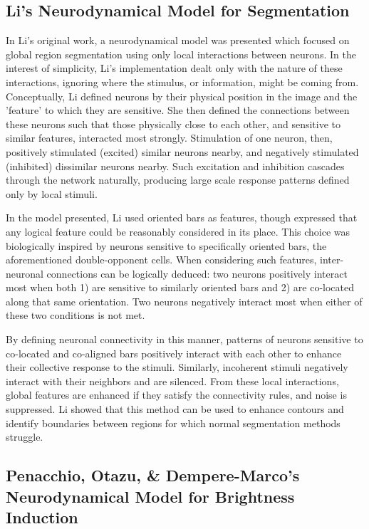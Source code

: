 \documentclass[journal,onecolumn]{IEEEtran}
\begin{document}
\subsection*{Li's Neurodynamical Model for Segmentation \cite{li:1999}}
In Li's original work, a neurodynamical model was presented which focused on global region segmentation using only local interactions between neurons. In the interest of simplicity, Li's implementation dealt only with the nature of these interactions, ignoring where the stimulus, or information, might be coming from. Conceptually, Li defined neurons by their physical position in the image and the 'feature' to which they are sensitive. She then defined the connections between these neurons such that those physically close to each other, and sensitive to similar features, interacted most strongly. Stimulation of one neuron, then, positively stimulated (excited) similar neurons nearby, and negatively stimulated (inhibited) dissimilar neurons nearby. Such excitation and inhibition cascades through the network naturally, producing large scale response patterns defined only by local stimuli.

In the model presented, Li used oriented bars as features, though expressed that any logical feature could be reasonably considered in its place. This choice was biologically inspired by neurons sensitive to specifically oriented bars, the aforementioned double-opponent cells. When considering such features, inter-neuronal connections can be logically deduced: two neurons positively interact most when both 1) are sensitive to similarly oriented bars and 2) are co-located along that same orientation. Two neurons negatively interact most when either of these two conditions is not met.

By defining neuronal connectivity in this manner, patterns of neurons sensitive to co-located and co-aligned bars positively interact with each other to enhance their collective response to the stimuli. Similarly, incoherent stimuli negatively interact with their neighbors and are silenced. From these local interactions, global features are enhanced if they satisfy the connectivity rules, and noise is suppressed. Li showed that this method can be used to enhance contours and identify boundaries between regions for which normal segmentation methods struggle.


\subsection*{Penacchio, Otazu, \& Dempere-Marco's Neurodynamical Model for Brightness Induction \cite{penacchio:2013}}
\end{document}
